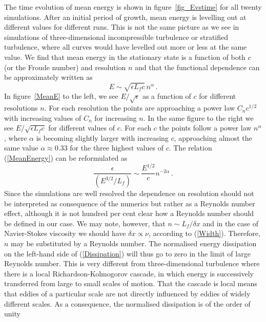 The time evolution of mean energy is shown in figure~\ref{fig_Evstime} for all
twenty simulations. After an initial period of growth, mean energy is levelling
out at different values for different runs. This is not the same picture as we
see in simulations of three-dimensional incompressible turbulence or stratified
turbulence, where all curves would have levelled out more or less at the same
value. We find that mean energy in the stationary state is a function of both $
c $ (or the Froude number) and resolution $ n $ and that the functional
dependence can be approximately written as
\begin{equation} \label{MeanEnergy}
E \sim \sqrt{\epsilon L_f c } \, n^{\alpha}  \, .
\end{equation}
 In figure~\ref{MeanE} to the
left, we see $ E/\sqrt{\epsilon} $ as a function of $ c $ for different resolutions $
n $. For each resolution the points are approaching a power law $ C_n c^{1/2} $
with increasing values of $ C_n $ for increasing $ n $. In the same figure to
the right we see $ E/\sqrt{\epsilon L_f c } $ for different values of $ c $. For
each $ c $ the points follow a power law $ n^{\alpha} $, where $ \alpha $ is
becoming slightly larger with increasing $ c $, approaching almost the same
value $ \alpha \approx 0.33 $ for the three highest values of $ c $. The
relation (\ref{MeanEnergy}) can be reformulated as
\begin{equation} \label{Dissipation}
\frac{\epsilon} {(E^{3/2} / L_f)} \sim \frac{E^{1/2}}{c} n^{-2\alpha} \, .
\end{equation}
Since the simulations are well resolved the dependence on resolution should not
be interpreted as consequence of the numerics but rather as a Reynolds number
effect, although it is not hundred per cent clear how a Reynolds number should
be defined in our case. We may note, however, that $ n \sim L_f/\delta x $ and in the case of Navier-Stokes viscosity
 we should have $ \delta x \propto \nu $, according to (\ref{Width}). Therefore,  $ n $ may be substituted by a Reynolds number. The normalised energy dissipation on the left-hand side of
(\ref{Dissipation}) will thus go to zero in the limit of large Reynolds number.
This is very different from three-dimensional turbulence where there is a local
Richardson-Kolmogorov cascade, in which energy is successively transferred from
large to small scales of motion. That the cascade is local means that eddies of
a particular scale are not directly influenced by eddies of widely different
scales. As a consequence, the normalised dissipation is of the order of unity
